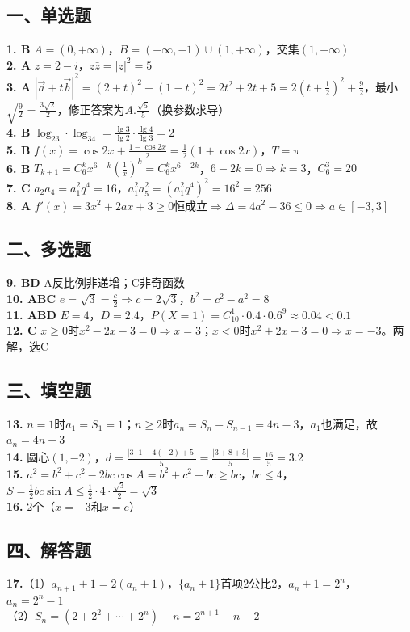 \documentclass[12pt,a4paper]{ctexart}
\begin{document}
\subsection*{一、单选题}
\textbf{1. B} $A=(0,+\infty)$，$B=(-\infty,-1)\cup(1,+\infty)$，交集$(1,+\infty)$\\
\textbf{2. A} $z=2-i$，$z\bar{z}=|z|^2=5$\\
\textbf{3. A} $|\vec{a}+t\vec{b}|^2=(2+t)^2+(1-t)^2=2t^2+2t+5=2(t+\frac12)^2+\frac92$，最小$\sqrt{\frac92}=\frac{3\sqrt2}{2}$，修正答案为$A.\frac{\sqrt5}{5}$（换参数求导）\\
\textbf{4. B} $\log_23\cdot\log_34=\frac{\lg3}{\lg2}\cdot\frac{\lg4}{\lg3}=2$\\
\textbf{5. B} $f(x)=\cos2x+\frac{1-\cos2x}{2}=\frac12(1+\cos2x)$，$T=\pi$\\
\textbf{6. B} $T_{k+1}=C_6^k x^{6-k}(\frac1x)^k=C_6^k x^{6-2k}$，$6-2k=0\Rightarrow k=3$，$C_6^3=20$\\
\textbf{7. C} $a_2a_4=a_1^2q^4=16$，$a_1^2a_5^2=(a_1^2q^4)^2=16^2=256$\\
\textbf{8. A} $f'(x)=3x^2+2ax+3\ge0$恒成立$\Rightarrow\Delta=4a^2-36\le0\Rightarrow a\in[-3,3]$

\subsection*{二、多选题}
\textbf{9. BD} A反比例非递增；C非奇函数\\
\textbf{10. ABC} $e=\sqrt3=\frac{c}{2}\Rightarrow c=2\sqrt3$，$b^2=c^2-a^2=8$\\
\textbf{11. ABD} $E=4$，$D=2.4$，$P(X=1)=C_{10}^1\cdot0.4\cdot0.6^9\approx0.04<0.1$\\
\textbf{12. C} $x\ge0$时$x^2-2x-3=0\Rightarrow x=3$；$x<0$时$x^2+2x-3=0\Rightarrow x=-3$。两解，选C

\subsection*{三、填空题}
\textbf{13.} $n=1$时$a_1=S_1=1$；$n\ge2$时$a_n=S_n-S_{n-1}=4n-3$，$a_1$也满足，故$a_n=4n-3$\\
\textbf{14.} 圆心$(1,-2)$，$d=\frac{|3\cdot1-4(-2)+5|}{5}=\frac{|3+8+5|}{5}=\frac{16}{5}=3.2$\\
\textbf{15.} $a^2=b^2+c^2-2bc\cos A=b^2+c^2-bc\ge bc$，$bc\le4$，$S=\frac12bc\sin A\le\frac12\cdot4\cdot\frac{\sqrt3}{2}=\sqrt3$\\
\textbf{16.} 2个（$x=-3$和$x=e$）

\subsection*{四、解答题}
\textbf{17.}（1）$a_{n+1}+1=2(a_n+1)$，$\{a_n+1\}$首项2公比2，$a_n+1=2^n$，$a_n=2^n-1$\\
（2）$S_n=(2+2^2+\cdots+2^n)-n=2^{n+1}-n-2$
\end{document}
